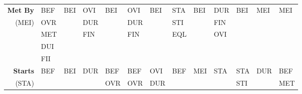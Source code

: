 \documentclass[11pt]{report}
\newenvironment{vvarmargin}[2]
{
  \begin{list}{}
  {
    \setlength{\topsep}{0pt}
    \setlength{\leftmargin}{0pt}
    \setlength{\rightmargin}{0pt}
    \setlength{\listparindent}{\parindent}
    \setlength{\itemindent}{\parindent}
    \setlength{\parsep}{0pt plus 1pt}
    \addtolength{\leftmargin}{#1}\addtolength{\rightmargin}{#2}
  }
  \item
}
{
  \end{list}
}
\begin{document}
\begin{table}[p]
\begin{vvarmargin}{-4cm}{-4cm}
\begin{center}
\begin{tabular}[t]{|r|l|l|l|l|l|l|l|l|l|l|l|l|}
                  \hline
                  \textbf{Met By}         & BEF                     & BEI                     & OVI                     & BEI                     & OVI                     & BEI                     & STA                     & BEI                     & DUR                     & BEI                     & MEI                     & MEI                     \\
                  (MEI)                   & OVR                     &                         & DUR                     &                         & DUR                     &                         & STI                     &                         & FIN                     &                         &                         &                         \\
                                          & MET                     &                         & FIN                     &                         & FIN                     &                         & EQL                     &                         & OVI                     &                         &                         &                         \\
                                          & DUI                     &                         &                         &                         &                         &                         &                         &                         &                         &                         &                         &                         \\
                                          & FII                     &                         &                         &                         &                         &                         &                         &                         &                         &                         &                         &                         \\
                  \hline
                  \textbf{Starts}         & BEF                     & BEI                     & DUR                     & BEF                     & BEF                     & OVI                     & BEF                     & MEI                     & STA                     & STA                     & DUR                     & BEF                     \\
                  (STA)                   &                         &                         &                         & OVR                     & OVR                     & DUR                     &                         &                         &                         & STI                     &                         & MET                     \\

\end{tabular}
\end{center}
\end{vvarmargin}
\end{table}
\end{document}
